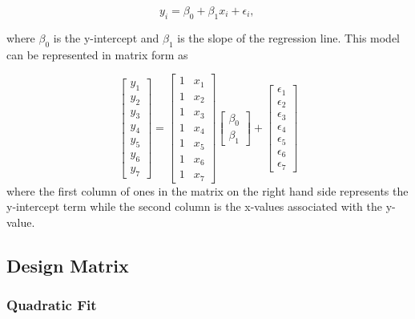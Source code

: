 \begin{equation}
  y_i = \beta_0 + \beta_1 x_i +\epsilon_i, \,
\end{equation}

where $\beta_0$ is the y-intercept and $\beta_1$ is the slope of the regression line. This model can be represented in matrix form as

\begin{equation}\label{eq:simpleRegressionMatrix}
  \begin{bmatrix}y_1 \\ y_2 \\ y_3 \\ y_4 \\ y_5 \\ y_6 \\ y_7 \end{bmatrix}
  =
  \begin{bmatrix}1 & x_1  \\1 & x_2  \\1 & x_3  \\1 & x_4  \\1 & x_5  \\1 & x_6 \\ 1 & x_7  \end{bmatrix}
  \begin{bmatrix} \beta_0 \\ \beta_1  \end{bmatrix}
  +
  \begin{bmatrix} \epsilon_1 \\ \epsilon_2 \\ \epsilon_3 \\ \epsilon_4 \\ \epsilon_5 \\ \epsilon_6 \\ \epsilon_7 \end{bmatrix}
\end{equation}
where the first column of ones in the matrix on the right hand side represents the y-intercept term while the second column is the x-values associated with the y-value.

\subsection{Design Matrix}


\subsubsection{Quadratic Fit}

